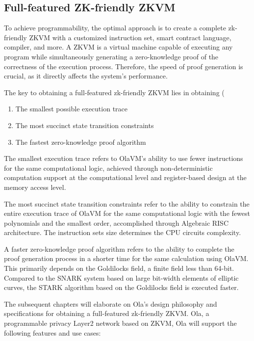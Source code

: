 \subsection{Full-featured ZK-friendly ZKVM}

To achieve programmability, the optimal approach is to create a complete zk-friendly ZKVM with a customized instruction set, smart contract language, compiler, and more. A ZKVM is a virtual machine capable of executing any program while simultaneously generating a zero-knowledge proof of the correctness of the execution process. Therefore, the speed of proof generation is crucial, as it directly affects the system's performance.

The key to obtaining a full-featured zk-friendly ZKVM lies in obtaining (
\begin{enumerate}
    \item The smallest possible execution trace
    \item The most succinct state transition constraints
    \item The fastest zero-knowledge proof algorithm
\end{enumerate}

The smallest execution trace refers to OlaVM's  \cite{website:OlaVM} ability to use fewer instructions for the same computational logic, achieved through non-deterministic computation support at the computational level and register-based design at the memory access level. 

The most succinct state transition constraints refer to the ability to constrain the entire execution trace of OlaVM for the same computational logic with the fewest polynomials and the smallest order, accomplished through Algebraic RISC architecture. The instruction sets size determines the CPU circuits complexity. 

A faster zero-knowledge proof algorithm refers to the ability to complete the proof generation process in a shorter time for the same calculation using OlaVM. This primarily depends on the Goldilocks \cite{website:Goldilocks} field, a finite field less than 64-bit. Compared to the SNARK system based on large bit-width elements of elliptic curves, the STARK algorithm based on the Goldilocks \cite{website:Goldilocks} field is executed faster.

The subsequent chapters will elaborate on Ola's design philosophy and specifications for obtaining a full-featured zk-friendly ZKVM. Ola, a programmable privacy Layer2 network based on ZKVM, Ola will support the following features and use cases: 

